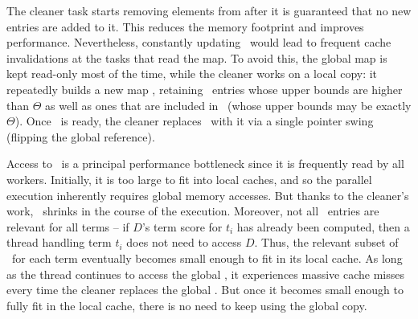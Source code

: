The cleaner task starts removing elements from  \DMap\/ after it is guaranteed that no new entries are added to it.
This reduces the memory footprint and improves performance. 
Nevertheless,  constantly updating \DMap\ would lead to frequent cache invalidations at the
tasks that read the map. 
To avoid this, 
the global map is kept read-only most of the time, while the cleaner works on a local copy: 
it  
repeatedly builds a new map \LDMap, retaining \DMap\ entries whose upper bounds 
are higher than $\Theta$ as well as ones that are included in \DHeap\ (whose upper bounds may be exactly $\Theta$).
Once \LDMap\ is ready, the cleaner replaces \DMap\ with it via a single pointer swing 
(flipping the global reference). 




Access to \DMap\ is a principal performance bottleneck since it is frequently read by all workers. Initially, it is too large to fit into local caches, and so the parallel execution inherently requires global memory accesses. But thanks to the cleaner's work, \DMap\ shrinks in the course of the execution. 
Moreover, not all  \DMap\ entries are relevant for all terms -- if $D$'s term score for $t_i$ has already been computed, then a  thread handling term $t_i$ does not need to access $D$.
Thus, the relevant subset of  \DMap\ for each term eventually becomes small enough to fit in its local cache. As long as the thread continues to access the global \DMap, it experiences massive cache misses every time the cleaner replaces the global \DMap. 
But 
once it becomes small enough to fully fit in the local cache, there is no need to keep using the global copy. 

